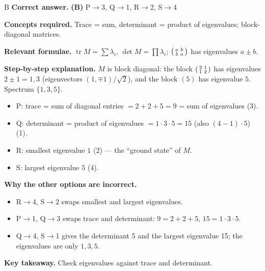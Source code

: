 \documentclass[11pt,a4paper]{article}
\newcommand{\qsep}{\par\vspace{2pt}{\color{black!15}\hrule}\vspace{4pt}}
\begin{document}
\begin{solbox}{B}
\textbf{\color{brand}Correct answer.} \textcolor{okgreen}{\textbf{(B)}} P$\to$3, Q$\to$1, R$\to$2, S$\to$4

\textbf{\color{brand}Concepts required.} Trace = sum, determinant = product of eigenvalues; block-diagonal matrices.

\textbf{\color{brand}Relevant formulae.} $\operatorname{tr}M = \sum\lambda_i$, $\det M = \prod\lambda_i$; $\begin{psmallmatrix}a&b\\b&a\end{psmallmatrix}$ has eigenvalues $a \pm b$.

\textbf{\color{brand}Step-by-step explanation.} $M$ is block diagonal: the block $\begin{psmallmatrix}2&1\\1&2\end{psmallmatrix}$ has eigenvalues $2 \pm 1 = 1, 3$ (eigenvectors $(1, \mp1)/\sqrt2$), and the
block $(5)$ has eigenvalue $5$. Spectrum $\{1, 3, 5\}$.
\begin{itemize}\itemsep0pt
\item P: trace = sum of diagonal entries $= 2 + 2 + 5 = 9$ = sum of eigenvalues (3).
\item Q: determinant = product of eigenvalues $= 1\cdot3\cdot5 = 15$ (also $(4 - 1)\cdot5$) (1).
\item R: smallest eigenvalue $1$ (2) --- the ``ground state'' of $M$.
\item S: largest eigenvalue $5$ (4).
\end{itemize}

\textbf{\color{brand}Why the other options are incorrect.}
\begin{itemize}[leftmargin=2.4em, itemsep=1pt, topsep=2pt]
\item[\textbf{(A)}] R$\to$4, S$\to$2 swaps smallest and largest eigenvalues.
\item[\textbf{(C)}] P$\to$1, Q$\to$3 swaps trace and determinant: $9 = 2+2+5$, $15 = 1\cdot3\cdot5$.
\item[\textbf{(D)}] Q$\to$4, S$\to$1 gives the determinant 5 and the largest eigenvalue 15; the eigenvalues are only $1, 3, 5$.
\end{itemize}
\textbf{\color{brand}Key takeaway.} Check eigenvalues against trace and determinant.
\end{solbox}
\qsep
\end{document}
